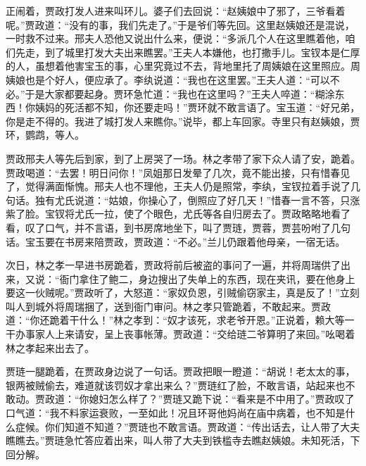 \begin{parag}
    正闹着，贾政打发人进来叫环儿。婆子们去回说：“赵姨娘中了邪了，三爷看着呢。”贾政道：“没有的事，我们先走了。”于是爷们等先回。这里赵姨娘还是混说，一时救不过来。邢夫人恐他又说出什么来，便说：“多派几个人在这里瞧着他，咱们先走，到了城里打发大夫出来瞧罢。”王夫人本嫌他，也打撒手儿。宝钗本是仁厚的人，虽想着他害宝玉的事，心里究竟过不去，背地里托了周姨娘在这里照应。周姨娘也是个好人，便应承了。李纨说道：“我也在这里罢。”王夫人道：“可以不必。”于是大家都要起身。贾环急忙道：“我也在这里吗？”王夫人啐道：“糊涂东西！你姨妈的死活都不知，你还要走吗！”贾环就不敢言语了。宝玉道：“好兄弟，你是走不得的。我进了城打发人来瞧你。”说毕，都上车回家。寺里只有赵姨娘，贾环，鹦鹉，等人。
\end{parag}


\begin{parag}
    贾政邢夫人等先后到家，到了上房哭了一场。林之孝带了家下众人请了安，跪着。贾政喝道：“去罢！明日问你！”凤姐那日发晕了几次，竟不能出接，只有惜春见了，觉得满面惭愧。邢夫人也不理他，王夫人仍是照常，李纨，宝钗拉着手说了几句话。独有尤氏说道：“姑娘，你操心了，倒照应了好几天！”惜春一言不答，只涨紫了脸。宝钗将尤氏一拉，使了个眼色，尤氏等各自归房去了。贾政略略地看了看，叹了口气，并不言语，到书房席地坐下，叫了贾琏，贾蓉，贾芸吩咐了几句话。宝玉要在书房来陪贾政，贾政道：“不必。”兰儿仍跟着他母亲，一宿无话。
\end{parag}


\begin{parag}
    次日，林之孝一早进书房跪着，贾政将前后被盗的事问了一遍，并将周瑞供了出来，又说：“衙门拿住了鲍二，身边搜出了失单上的东西，现在夹讯，要在他身上要这一伙贼呢。”贾政听了，大怒道：“家奴负恩，引贼偷窃家主，真是反了！”立刻叫人到城外将周瑞捆了，送到衙门审问。林之孝只管跪着，不敢起来。贾政道：“你还跪着干什么！”林之孝到：“奴才该死，求老爷开恩。”正说着，赖大等一干办事家人上来请安，呈上丧事帐薄。贾政道：“交给琏二爷算明了来回。”吆喝着林之孝起来出去了。
\end{parag}


\begin{parag}
    贾琏一腿跪着，在贾政身边说了一句话。贾政把眼一瞪道：“胡说！老太太的事，银两被贼偷去，难道就该罚奴才拿出来么？”贾琏红了脸，不敢言语，站起来也不敢动。贾政道：“你媳妇怎么样了？”贾琏又跪下说：“看来是不中用了。”贾政叹了口气道：“我不料家运衰败，一至如此！况且环哥他妈尚在庙中病着，也不知是什么症候。你们知道不知道？”贾琏也不敢言语。贾政道：“传出话去，让人带了大夫瞧瞧去。”贾琏急忙答应着出来，叫人带了大夫到铁槛寺去瞧赵姨娘。未知死活，下回分解。
\end{parag}